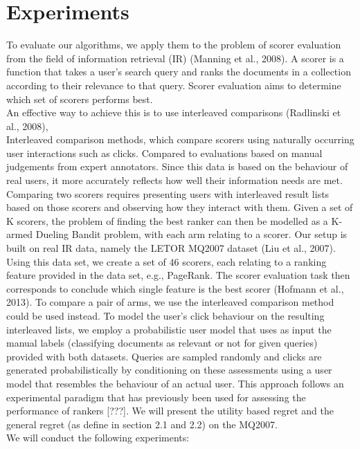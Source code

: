 \documentclass{llncs}
\begin{document}
\newpage
	
		
\section{Experiments}

To evaluate our algorithms, we apply them to the problem of
scorer evaluation from the field of information retrieval
(IR) (Manning et al., 2008). A scorer is a
function that takes a user's search query and
ranks the documents in a collection according to their
relevance to that query. Scorer evaluation aims to determine
which set of scorers performs best.
\\
An effective way to achieve this is to use interleaved
comparisons (Radlinski et al., 2008),  
\\
Interleaved comparison methods, which compare scorers
using naturally occurring user interactions such as clicks. 
Compared to evaluations based on manual judgements from expert annotators.
Since this data is based on the behaviour of real users, it more
accurately reflects how well their information needs are met. 
Comparing two scorers requires presenting users with
interleaved result lists based on those scorers and observing how
they interact with them. 
Given a set of K scorers, the
problem of finding the best ranker can then be modelled as a K-armed Dueling Bandit problem, with each arm relating to a scorer.
Our setup is built on real IR data,
namely the LETOR MQ2007 dataset (Liu et al., 2007).
Using this data set, we create a set of 46 scorers, each
relating to a ranking feature provided in the
data set, e.g., PageRank. The scorer evaluation task
then corresponds to conclude which single feature
is the best scorer (Hofmann et al., 2013).
To compare a pair of arms, we use the interleaved comparison
method could be used instead. 
To model the user’s click behaviour on the resulting interleaved lists, we employ a probabilistic user model that uses as input the manual labels (classifying documents as relevant or not for given queries) provided with both datasets. 
Queries are sampled randomly and clicks are generated probabilistically by conditioning on these assessments using a user model that resembles the behaviour of an actual user. 
This approach follows an experimental paradigm that has previously been
used for assessing the performance of rankers [???].
We will present the utility based regret and the general regret (as define in section 2.1 and 2.2) on the MQ2007. 
\\
We will conduct the following experiments:
\end{document}
